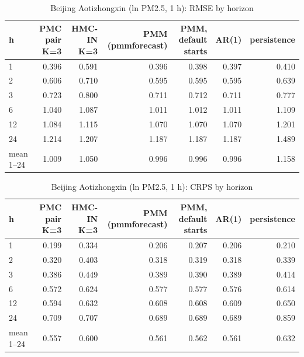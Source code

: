 \begin{table}[ht]\centering\small
\caption{Beijing Aotizhongxin (ln PM2.5, 1 h): RMSE by horizon}
\begin{tabular}{lrrrrrr}
\hline
h & PMC pair K=3 & HMC-IN K=3 & PMM (pmmforecast) & PMM, default starts & AR(1) & persistence \\ \hline
1 & 0.396 & 0.591 & 0.396 & 0.398 & 0.397 & 0.410 \\
2 & 0.606 & 0.710 & 0.595 & 0.595 & 0.595 & 0.639 \\
3 & 0.723 & 0.800 & 0.711 & 0.712 & 0.711 & 0.777 \\
6 & 1.040 & 1.087 & 1.011 & 1.012 & 1.011 & 1.109 \\
12 & 1.084 & 1.115 & 1.070 & 1.070 & 1.070 & 1.201 \\
24 & 1.214 & 1.207 & 1.187 & 1.187 & 1.187 & 1.489 \\
mean 1–24 & 1.009 & 1.050 & 0.996 & 0.996 & 0.996 & 1.158 \\
\hline\end{tabular}\end{table}

\begin{table}[ht]\centering\small
\caption{Beijing Aotizhongxin (ln PM2.5, 1 h): CRPS by horizon}
\begin{tabular}{lrrrrrr}
\hline
h & PMC pair K=3 & HMC-IN K=3 & PMM (pmmforecast) & PMM, default starts & AR(1) & persistence \\ \hline
1 & 0.199 & 0.334 & 0.206 & 0.207 & 0.206 & 0.210 \\
2 & 0.320 & 0.403 & 0.318 & 0.319 & 0.318 & 0.339 \\
3 & 0.386 & 0.449 & 0.389 & 0.390 & 0.389 & 0.414 \\
6 & 0.572 & 0.624 & 0.577 & 0.577 & 0.576 & 0.614 \\
12 & 0.594 & 0.632 & 0.608 & 0.608 & 0.609 & 0.650 \\
24 & 0.709 & 0.707 & 0.689 & 0.689 & 0.689 & 0.859 \\
mean 1–24 & 0.557 & 0.600 & 0.561 & 0.562 & 0.561 & 0.632 \\
\hline\end{tabular}\end{table}


